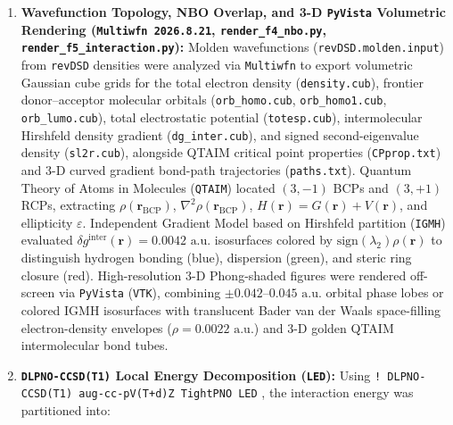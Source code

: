 \documentclass[journal=jpclcd,manuscript=article]{achemso}
\begin{document}
\begin{enumerate}
\begin{equation}
    V(R_{\mathrm{COM}}, \theta) = E_{\mathrm{min}}(\theta) + D_{\mathrm{eff}}(\theta)\left\{1 - \exp\!\left[-a\left(R_{\mathrm{COM}} - R_{\mathrm{eq}}(\theta)\right)\right]\right\}^2.
  \end{equation}
  The resulting unclipped surfaces ($0\text{--}16\text{ kcal mol}^{-1}$ for $\ce{HCOOH\bond{...}H2S}$ and $0\text{--}7\text{ kcal mol}^{-1}$ for $\ce{HCOOH\bond{...}N2O}$) are rendered in polar Cartesian $(X,Y)$ coordinates (Panel a), unrolled 3-D cylindrical $(\theta, R_{\mathrm{COM}}, \Delta E)$ coordinates resolving every minimum and saddle barrier $\mathrm{TS}_1\text{--}\mathrm{TS}_3$ (Panel b), and 1-D inversion/pseudorotation cross-sections (Panel c).
  \item \textbf{Wavefunction Topology, NBO Overlap, and 3-D \texttt{PyVista} Volumetric Rendering (\texttt{Multiwfn 2026.8.21}, \texttt{render\_f4\_nbo.py}, \texttt{render\_f5\_interaction.py}):} Molden wavefunctions (\texttt{revDSD.molden.input}) from \texttt{revDSD} densities were analyzed via \texttt{Multiwfn} \cite{Lu2012, Lu2024} to export volumetric Gaussian cube grids for the total electron density (\texttt{density.cub}), frontier donor--acceptor molecular orbitals (\texttt{orb\_homo.cub}, \texttt{orb\_homo1.cub}, \texttt{orb\_lumo.cub}), total electrostatic potential (\texttt{totesp.cub}), intermolecular Hirshfeld density gradient (\texttt{dg\_inter.cub}), and signed second-eigenvalue density (\texttt{sl2r.cub}), alongside QTAIM critical point properties (\texttt{CPprop.txt}) and 3-D curved gradient bond-path trajectories (\texttt{paths.txt}). Quantum Theory of Atoms in Molecules (\texttt{QTAIM}) \cite{Bader1990} located $(3,-1)$ BCPs and $(3,+1)$ RCPs, extracting $\rho(\mathbf{r}_{\mathrm{BCP}})$, $\nabla^2\rho(\mathbf{r}_{\mathrm{BCP}})$, $H(\mathbf{r}) = G(\mathbf{r}) + V(\mathbf{r})$, and ellipticity $\varepsilon$. Independent Gradient Model based on Hirshfeld partition (\texttt{IGMH}) \cite{Lefebvre2017, Lu2022} evaluated $\delta g^{\mathrm{inter}}(\mathbf{r}) = 0.0042\text{ a.u.}$ isosurfaces colored by $\mathrm{sign}(\lambda_2)\rho(\mathbf{r})$ to distinguish hydrogen bonding (blue), dispersion (green), and steric ring closure (red). High-resolution 3-D Phong-shaded figures were rendered off-screen via \texttt{PyVista} (\texttt{VTK}), combining $\pm 0.042\text{--}0.045\text{ a.u.}$ orbital phase lobes or colored IGMH isosurfaces with translucent Bader van der Waals space-filling electron-density envelopes ($\rho = 0.0022\text{ a.u.}$) and 3-D golden QTAIM intermolecular bond tubes.
  \item \textbf{\texttt{DLPNO-CCSD(T1)} Local Energy Decomposition (\texttt{LED}):} Using \texttt{! DLPNO-CCSD(T1) aug-cc-pV(T+d)Z TightPNO LED} \cite{Schneider2016, Altun2018}, the interaction energy was partitioned into:

\end{enumerate}
\end{document}
